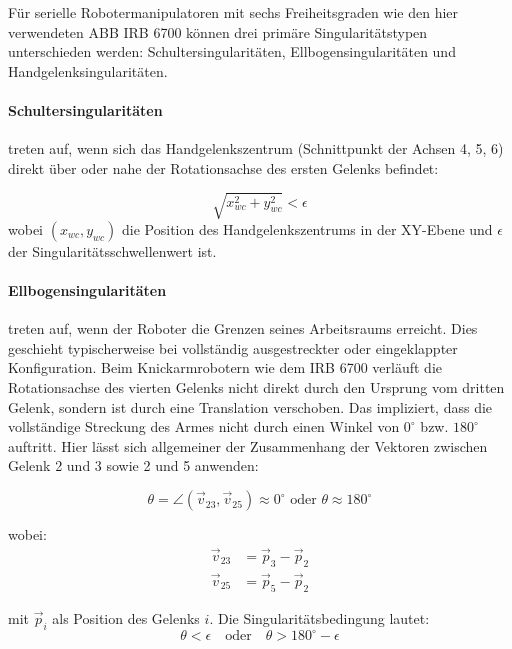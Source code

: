 \noindent
Für serielle Robotermanipulatoren mit sechs Freiheitsgraden wie den hier
verwendeten ABB IRB 6700 können drei primäre Singularitätstypen unterschieden
werden: Schultersingularitäten, Ellbogensingularitäten und
Handgelenksingularitäten.

\paragraph{Schultersingularitäten} treten auf, wenn sich das
Handgelenkszentrum (Schnittpunkt der Achsen 4, 5, 6) direkt über oder nahe der
Rotationsachse des ersten Gelenks befindet:

\begin{equation}
	\sqrt{x_{wc}^2 + y_{wc}^2} < \epsilon
	\label{eq:shoulder_singularity}
\end{equation}
\noindent
wobei $(x_{wc}, y_{wc})$ die Position des Handgelenkszentrums in der XY-Ebene
und $\epsilon$ der Singularitätsschwellenwert ist.

\paragraph{Ellbogensingularitäten} treten auf, wenn der Roboter die Grenzen seines
Arbeitsraums erreicht. Dies geschieht typischerweise bei vollständig
ausgestreckter oder eingeklappter Konfiguration. Beim Knickarmrobotern wie dem IRB 6700
verläuft die Rotationsachse des vierten Gelenks nicht direkt durch den Ursprung vom
dritten Gelenk, sondern ist durch eine Translation verschoben. Das impliziert,
dass die vollständige Streckung des Armes nicht durch einen Winkel von $0^\circ$ bzw.
$180^\circ$ auftritt. Hier lässt sich allgemeiner der Zusammenhang der Vektoren
zwischen Gelenk 2 und 3 sowie 2 und 5 anwenden:

\begin{equation}
	\theta = \angle(\vec{v}_{23}, \vec{v}_{25}) \approx 0^\circ \text{ oder } \theta \approx 180^\circ
	\label{eq:elbow_singularity}
\end{equation}

wobei:
\begin{align}
	\vec{v}_{23} & = \vec{p}_3 - \vec{p}_2 \\
	\vec{v}_{25} & = \vec{p}_5 - \vec{p}_2
\end{align}

mit $\vec{p}_i$ als Position des Gelenks $i$. Die Singularitätsbedingung lautet:
\begin{equation}
	\theta < \epsilon \quad \text{oder} \quad \theta > 180^\circ - \epsilon
\end{equation}

